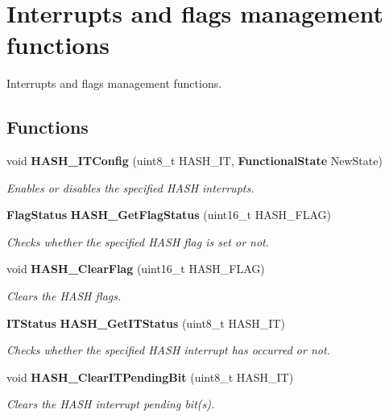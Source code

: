 \section{Interrupts and flags management functions}
\label{group__HASH__Group5}


Interrupts and flags management functions.  


\subsection*{Functions}
\begin{DoxyCompactItemize}
\item 
void \textbf{ H\+A\+S\+H\+\_\+\+I\+T\+Config} (uint8\+\_\+t H\+A\+S\+H\+\_\+\+IT, \textbf{ Functional\+State} New\+State)
\begin{DoxyCompactList}\small\item\em Enables or disables the specified H\+A\+SH interrupts. \end{DoxyCompactList}\item 
\textbf{ Flag\+Status} \textbf{ H\+A\+S\+H\+\_\+\+Get\+Flag\+Status} (uint16\+\_\+t H\+A\+S\+H\+\_\+\+F\+L\+AG)
\begin{DoxyCompactList}\small\item\em Checks whether the specified H\+A\+SH flag is set or not. \end{DoxyCompactList}\item 
void \textbf{ H\+A\+S\+H\+\_\+\+Clear\+Flag} (uint16\+\_\+t H\+A\+S\+H\+\_\+\+F\+L\+AG)
\begin{DoxyCompactList}\small\item\em Clears the H\+A\+SH flags. \end{DoxyCompactList}\item 
\textbf{ I\+T\+Status} \textbf{ H\+A\+S\+H\+\_\+\+Get\+I\+T\+Status} (uint8\+\_\+t H\+A\+S\+H\+\_\+\+IT)
\begin{DoxyCompactList}\small\item\em Checks whether the specified H\+A\+SH interrupt has occurred or not. \end{DoxyCompactList}\item 
void \textbf{ H\+A\+S\+H\+\_\+\+Clear\+I\+T\+Pending\+Bit} (uint8\+\_\+t H\+A\+S\+H\+\_\+\+IT)
\begin{DoxyCompactList}\small\item\em Clears the H\+A\+SH interrupt pending bit(s). \end{DoxyCompactList}\end{DoxyCompactItemize}


